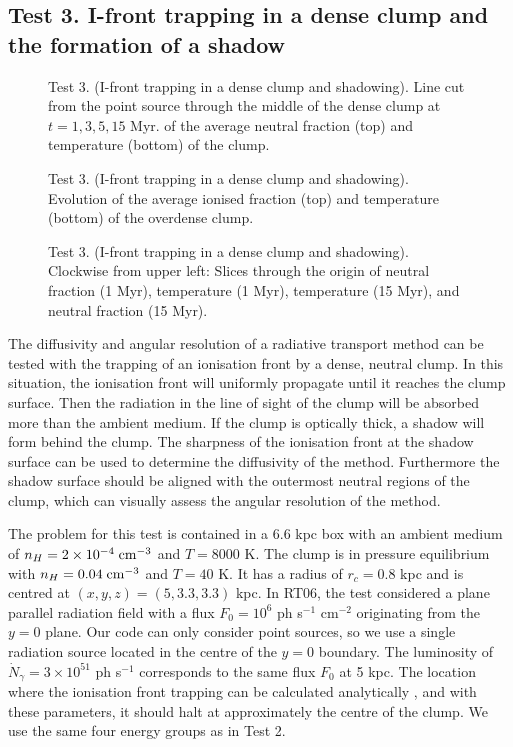 \documentclass[useAMS,usenatbib]{mn2e}
\begin{document}
\subsection{Test 3. I-front trapping in a dense clump and the
  formation of a shadow}
\label{sec:test3}

\begin{figure}
  \caption{\label{fig:test3_1} Test 3. (I-front trapping in a dense
    clump and shadowing).  Line cut from the point source through the
    middle of the dense clump at $t = 1, 3, 5, 15$ Myr.  of the
    average neutral fraction (top) and temperature (bottom) of the
    clump.}
\end{figure}

\begin{figure}
  \caption{\label{fig:test3_2} Test 3. (I-front trapping in a dense
    clump and shadowing).  Evolution of the average ionised fraction
    (top) and temperature (bottom) of the overdense clump.}
\end{figure}

\begin{figure*}
  \caption{\label{fig:test3_3} Test 3. (I-front trapping in a dense
    clump and shadowing).  Clockwise from upper left: Slices through
    the origin of neutral fraction (1 Myr), temperature (1 Myr),
    temperature (15 Myr), and neutral fraction (15 Myr).}
\end{figure*}

The diffusivity and angular resolution of a radiative transport method
can be tested with the trapping of an ionisation front by a dense,
neutral clump.  In this situation, the ionisation front will uniformly
propagate until it reaches the clump surface.  Then the radiation in
the line of sight of the clump will be absorbed more than the ambient
medium.  If the clump is optically thick, a shadow will form behind
the clump.  The sharpness of the ionisation front at the shadow
surface can be used to determine the diffusivity of the method.
Furthermore the shadow surface should be aligned with the outermost
neutral regions of the clump, which can visually assess the angular
resolution of the method.

The problem for this test is contained in a 6.6 kpc box with an
ambient medium of $n_H = 2 \times 10^{-4}\;\cubecm$ and $T = 8000$ K.
The clump is in pressure equilibrium with $n_H = 0.04\; \cubecm$ and
$T = 40$ K.  It has a radius of $r_c = 0.8$ kpc and is centred at
$(x,y,z) = (5, 3.3, 3.3)$ kpc.  In RT06, the test considered a plane
parallel radiation field with a flux $F_0 = 10^6$ ph s$^{-1}$
cm$^{-2}$ originating from the $y=0$ plane.  Our code can only
consider point sources, so we use a single radiation source located in
the centre of the $y=0$ boundary.  The luminosity of $\dot{N}_\gamma =
3 \times 10^{51}$ ph s$^{-1}$ corresponds to the same flux $F_0$ at 5
kpc.  The location where the ionisation front trapping can be
calculated analytically \citep{Shapiro04}, and with these parameters,
it should halt at approximately the centre of the clump.  We use the
same four energy groups as in Test 2.
\end{document}
